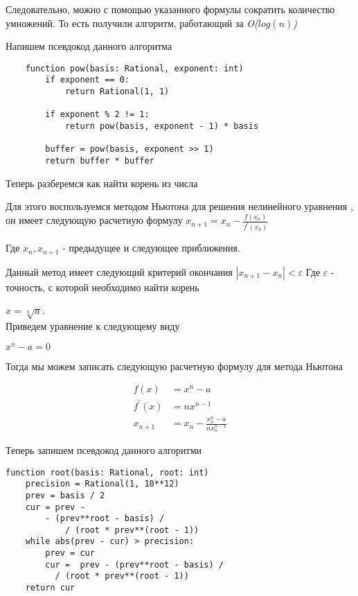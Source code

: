 \documentclass[a4paper,article,14pt]{extarticle}
\begin{document}
Следовательно, можно с помощью указанного формулы сократить количество умножений.
То есть получили алгоритм, работающий за \emph{O($log(n)$)}

Напишем псевдокод данного алгоритма

\begin{lstlisting}
    function pow(basis: Rational, exponent: int)
        if exponent == 0:
            return Rational(1, 1)
        
        if exponent % 2 != 1:
            return pow(basis, exponent - 1) * basis
        
        buffer = pow(basis, exponent >> 1)
        return buffer * buffer
\end{lstlisting}

Теперь разберемся как найти корень из числа

Для этого воспользуемся методом Ньютона для решения нелинейного уравнения \cite{item1},
он имеет следующую расчетную формулу $ x_{n + 1} = x_n - \frac{f(x_n)}{f^\prime(x_n)} $

Где $ x_n, x_{n + 1} $ - предыдущее и следующее приближения. 

Данный метод имеет следующий критерий окончания $ \left|x_{n + 1} - x_n \right| < \varepsilon $ 
Где $ \varepsilon $ - точность, с которой необходимо найти корень

$ x = \sqrt[n]{a} $. \\
Приведем уравнение к следующему виду

$ x^n - a = 0 $

Тогда мы можем записать следующую расчетную формулу для метода Ньютона

\begin{equation}
    \begin{split}
        f(x) &= x^n - a \\
        f^\prime(x) &= nx^{n - 1} \\
        x_{n + 1} &= x_n - \frac{x_n^n - a}{nx_n^{n - 1}}
    \end{split}
\end{equation}

Теперь запишем псевдокод данного алгоритми

\begin{lstlisting}
function root(basis: Rational, root: int)
    precision = Rational(1, 10**12)
    prev = basis / 2
    cur = prev - 
        - (prev**root - basis) / 
            / (root * prev**(root - 1))
    while abs(prev - cur) > precision:
        prev = cur
        cur =  prev - (prev**root - basis) / 
          / (root * prev**(root - 1))   
    return cur
\end{lstlisting}
\end{document}
